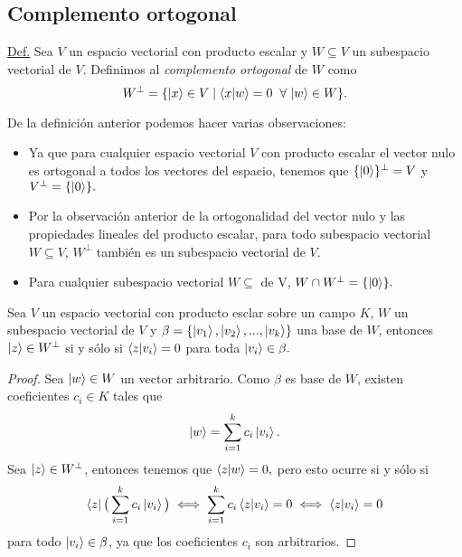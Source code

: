 \documentclass[12pt,dvipsnames]{article}
\newenvironment{lema}[2][Lema]{\begin{trivlist}
\item[\hskip \labelsep {\bfseries #1}\hskip \labelsep {\bfseries #2.}]}{\end{trivlist}}
\begin{document}
\newpage
\subsection{Complemento ortogonal} \label{Subsec:Complemento_ortogonal} 

\begin{tcolorbox}
    \underline{Def.} Sea $V$ un espacio vectorial con producto escalar y $W\subseteq V$ un subespacio vectorial de $V$. Definimos al \emph{complemento ortogonal} de $W$ como \[
        W^{\perp}=\{\ket{x}\in V\mid \braket{x|w}=0\hspace{2mm}\forall\hspace{0.5mm} \ket{w}\in W\} 
    .\] 
\end{tcolorbox}

\noindent De la definición anterior podemos hacer varias observaciones:
\begin{itemize}
    \item Ya que para cualquier espacio vectorial $V$ con producto escalar el vector nulo es ortogonal a todos los vectores del espacio, tenemos que $\{\ket{0}\}^{\perp}=V$ y $V^{\perp}=\{\ket{0}\}.$
    \item Por la observación anterior de la ortogonalidad del vector nulo y las propiedades lineales del producto escalar, para todo subespacio vectorial $W\subseteq V$, $W^{\perp}$ también es un subespacio vectorial de $V$.
    \item Para cualquier subespacio vectorial $W\subseteq$ de V, $W\cap W^{\perp}=\{\ket{0}\}.$
\end{itemize}

\begin{lema} {13.3.1}
    Sea $V$ un espacio vectorial con producto esclar sobre un campo $K$, $W$ un subespacio vectorial de $V$ y $\beta=\{\ket{v_1}, \ket{v_2},..., \ket{v_k}\}$ una base de $W$, entonces $\ket{z}\in W^{\perp}$ si y sólo si $\braket{z|v_i}=0$ para toda $\ket{v_i}\in\beta.$

    \begin{proof}
        Sea $\ket{w}\in W$ un vector arbitrario. Como $\beta$ es base de $W$, existen coeficientes $c_i\in K$ tales que \[
            \ket{w}=\sum_{i=1}^k c_i\ket{v_i}
        .\] \noindent Sea $\ket{z}\in W^{\perp}$, entonces tenemos que $\braket{z|w}=0,$ pero esto ocurre si y sólo si \[
        \bra{z}\big(\sum_{i=1}^k c_i\ket{v_i}\big)\iff \sum_{i=1}^k c_i \braket{z|v_i}=0\iff \braket{z|v_i}=0
    \] \noindent para todo $\ket{v_i}\in\beta$, ya que los coeficientes $c_i$ son arbitrarios. 
    \end{proof}

\end{lema}
\end{document}
